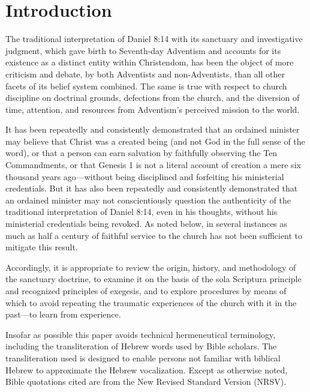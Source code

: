 \part*{Introduction}

The traditional interpretation of Daniel 8:14 with its sanctuary and investigative
judgment, which gave birth to Seventh-day Adventism and accounts for its
existence as a distinct entity within Christendom, has been the object of more
criticism and debate, by both Adventists and non-Adventists, than all other facets
of its belief system combined. The same is true with respect to church discipline
on doctrinal grounds, defections from the church, and the diversion of time,
attention, and resources from Adventism's perceived mission to the world.

It has been repeatedly and consistently demonstrated that an ordained minister
may believe that Christ was a created being (and not God in the full sense of the
word), or that a person can earn salvation by faithfully observing the Ten
Commandments, or that Genesis 1 is not a literal account of creation a mere six
thousand years ago---without being disciplined and forfeiting his ministerial
credentials. But it has also been repeatedly and consistently demonstrated that
an ordained minister may not conscientiously question the authenticity of the
traditional interpretation of Daniel 8:14, even in his thoughts, without his
ministerial credentials being revoked. As noted below, in several instances as
much as half a century of faithful service to the church has not been sufficient to
mitigate this result.

Accordingly, it is appropriate to review the origin, history, and methodology of
the sanctuary doctrine, to examine it on the basis of the sola Scriptura principle
and recognized principles of exegesis, and to explore procedures by means of
which to avoid repeating the traumatic experiences of the church with it in the
past---to learn from experience.

Insofar as possible this paper avoids technical hermeneutical terminology,
including the transliteration of Hebrew words used by Bible scholars. The
transliteration used is designed to enable persons not familiar with biblical
Hebrew to approximate the Hebrew vocalization. Except as otherwise noted, Bible
quotations cited are from the New Revised Standard Version (NRSV).
